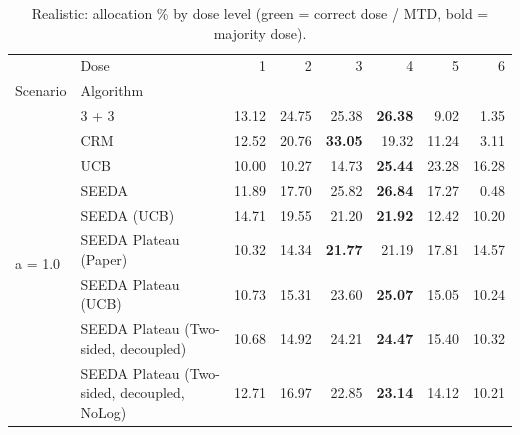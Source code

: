 \begin{table}[H]
\centering
\caption{Realistic: allocation \% by dose level (green = correct dose / MTD, bold = majority dose).}
\label{tab:real_alloc_by_dose}
\begin{tabular}{llrrrrrr}
\toprule
 & Dose & 1 & 2 & 3 & 4 & 5 & 6 \\
Scenario & Algorithm &  &  &  &  &  &  \\
\midrule
\multirow[c]{9}{*}{a = 1.0} & 3 + 3 & 13.12 & 24.75 & {\cellcolor[HTML]{C8E6C9}} 25.38 & \bfseries 26.38 & 9.02 & 1.35 \\
 & CRM & 12.52 & 20.76 & {\cellcolor[HTML]{C8E6C9}} \bfseries 33.05 & 19.32 & 11.24 & 3.11 \\
 & UCB & 10.00 & 10.27 & {\cellcolor[HTML]{C8E6C9}} 14.73 & \bfseries 25.44 & 23.28 & 16.28 \\
 & SEEDA & 11.89 & 17.70 & {\cellcolor[HTML]{C8E6C9}} 25.82 & \bfseries 26.84 & 17.27 & 0.48 \\
 & SEEDA (UCB) & 14.71 & 19.55 & {\cellcolor[HTML]{C8E6C9}} 21.20 & \bfseries 21.92 & 12.42 & 10.20 \\
 & SEEDA Plateau (Paper) & 10.32 & 14.34 & {\cellcolor[HTML]{C8E6C9}} \bfseries 21.77 & 21.19 & 17.81 & 14.57 \\
 & SEEDA Plateau (UCB) & 10.73 & 15.31 & {\cellcolor[HTML]{C8E6C9}} 23.60 & \bfseries 25.07 & 15.05 & 10.24 \\
 & SEEDA Plateau (Two-sided, decoupled) & 10.68 & 14.92 & {\cellcolor[HTML]{C8E6C9}} 24.21 & \bfseries 24.47 & 15.40 & 10.32 \\
 & SEEDA Plateau (Two-sided, decoupled, NoLog) & 12.71 & 16.97 & {\cellcolor[HTML]{C8E6C9}} 22.85 & \bfseries 23.14 & 14.12 & 10.21 \\
\bottomrule
\end{tabular}
\end{table}
